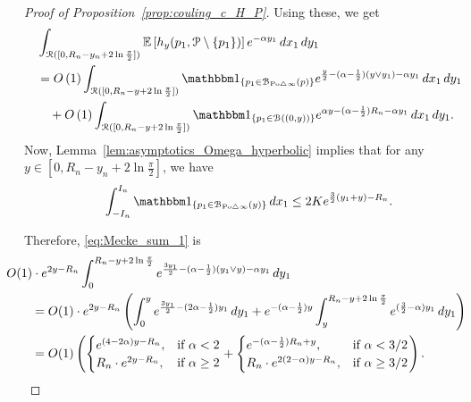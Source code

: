 \begin{proof}[Proof of Proposition~\ref{prop:couling_c_H_P}]
Using these, we get
\begin{align} 
	&\int_{\Rcal ([0, R_n - y_n + 2 \ln \frac{\pi}{2}])} \Exp{h_y(p_1, \Pcal \setminus \{p_1\})} 
    e^{-\alpha y_1} \, dx_1 \, dy_1 \notag \\
	&= \bigO{1} \int_{\Rcal ([0, R_n - y+ 2 \ln \frac{\pi}{2}])} \ind{p_1 \in \BallSym{p}} 
		e^{\frac{y}{2} - (\alpha - \frac{1}{2}) (y \vee y_1) - \alpha y_1} \, dx_1 \, dy_1
		\label{eq:Mecke_sum_1}\\ 
	&\hspace{10pt}+ \bigO{1} \int_{\Rcal ([0, R_n - y + 2 \ln \frac{\pi}{2}])} 
    	\ind{p_1 \in \BallHyp{(0,y)}} 
    	e^{\alpha y - (\alpha - \frac{1}{2})R_n - \alpha y_1} \, dx_1 \, dy_1.\label{eq:Mecke_sum_2}
\end{align}
Now, Lemma~\ref{lem:asymptotics_Omega_hyperbolic} implies that 
for any $y \in [0, R_n - y_n + 2 \ln \frac{\pi}{2}]$, we have 
\[ 
	\int_{-I_n}^{I_n} \ind{p_1 \in \BallSym{y}} \, dx_1 \leq 2 K e^{\frac{3}{2} (y_1 + y) - R_n}.
\]

Therefore, \eqref{eq:Mecke_sum_1} is 
\begin{align*}
	&\hspace{-20pt}O(1) \cdot e^{2 y - R_n} \int_{0}^{R_n - y + 2 \ln \frac{\pi}{2}} 
    	e^{\frac{3y_1}{2} - (\alpha - \frac{1}{2})(y_1 \vee y) - \alpha y_1} \, dy_1 \\
 	&=  O(1) \cdot e^{2 y - R_n} \left( \int_{0}^{y} e^{\frac{3y_1}{2} - (2\alpha - \frac{1}{2})y_1} \, dy_1 
 		+ e^{-(\alpha-\frac{1}{2}) y}\int_{y}^{R_n - y + 2 \ln \frac{\pi}{2}} e^{(\frac{3}{2} - \alpha) y_1} \, dy_1 \right)\\
  	&= O(1) \left( 
	\begin{cases}
	e^{(4-2\alpha) y - R_n}, & \mbox{if $\alpha < 2$} \\
	R_n \cdot e^{2y - R_n}, & \mbox{if $\alpha \geq 2$}
	\end{cases}
	+
	\begin{cases}
	e^{-(\alpha - \frac{1}{2})R_n +y}, & \mbox{if $\alpha < 3/2$} \\
	R_n \cdot  e^{2(2-\alpha)y - R_n}, & \mbox{if $\alpha \geq 3/2$}
	\end{cases}\right).
\end{align*}


\end{proof}
